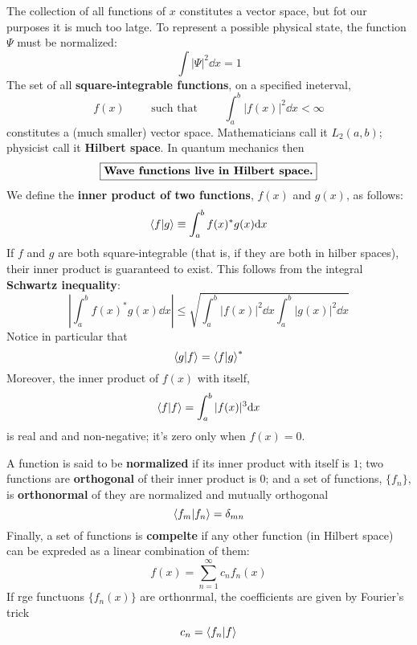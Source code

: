 The collection of all functions of $x$ constitutes a vector space, but fot our purposes it is much too latge. To represent a possible physical state, the function $\Psi$ must be normalized:
$$\int |\Psi|^2\dd x=1$$ The set of all \textbf{square-integrable functions}, on a specified ineterval,
\begin{equation}\label{3.4}
	f(x)\qquad \mbox{ such that  }\qquad \int_a^b |f(x)|^2\dd x<\infty
\end{equation}
constitutes a (much smaller) vector space. Mathematicians call it $L_2(a,b)$; physicist call it \textbf{Hilbert space}. In quantum mechanics then
\begin{equation}\label{3.5}
	\boxed{\mbox{\textbf{Wave functions live in Hilbert space.}}}
\end{equation}
We define the \textbf{inner product of two functions}, $f(x)$ and $g(x)$, as follows:
\begin{equation}\label{3.6}
	\braket{f}{g}\equiv\int_a^b f(x)^*g(x)\dd x
\end{equation}
If $f$ and $g$ are both square-integrable (that is, if they are both in hilber spaces), their inner product is guaranteed to exist. This follows from the integral \textbf{Schwartz inequality}:
\begin{equation}\label{3.7}
	\left|\int_a^bf(x)^*g(x)\dd x\right|\leq \sqrt{\int_a^b|f(x)|^2\dd x\int_a^b|g(x)|^2\dd x}
\end{equation}
Notice in particular that
\begin{equation}\label{3.8}
	\braket{g}{f}=\braket{f}{g}^*
\end{equation}
Moreover, the inner product of $f(x)$ with itself,
\begin{equation}\label{3.9}
	\braket{f}{f}=\int_a^b|f(x)|^3\dd x
\end{equation}
is real and and non-negative; it's zero only when $f(x)=0$. 

A function is said to be \textbf{normalized} if its inner product with itself is $1$; two functions are \textbf{orthogonal} of their inner product is $0$; and a set of functions, $\{f_n\}$, is \textbf{orthonormal} of they are normalized and mutually orthogonal
\begin{equation}\label{3.10}
	\braket{f_m}{f_n}=\delta_{mn}
\end{equation}
Finally, a set of functions is \textbf{compelte} if any other function (in Hilbert space) can be expreded as a linear combination of them:
\begin{equation}\label{3.11}
	f(x)=\sum_{n=1}^\infty c_nf_n(x)
\end{equation}
If rge functuons $\{f_n(x)\}$ are orthonrmal, the coefficients are given by Fourier's trick
\begin{equation}\label{3.12}
	c_n=\braket{f_n}{f}
\end{equation}

